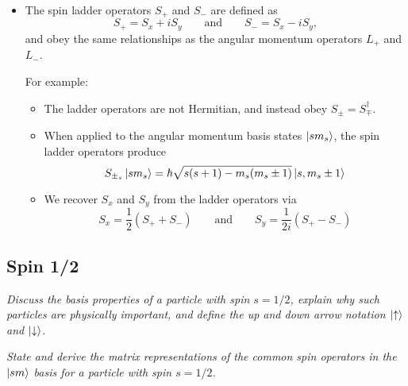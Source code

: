 \documentclass[11pt, a4paper]{article}
\newcommand{\eqtext}[1]{\qquad \text{#1} \qquad}
\newcommand{\Herm}{Hermitian\xspace}
\newcommand{\ua}{\uparrow}  %
\newcommand{\da}{\downarrow}  %
\begin{document}
\begin{itemize}
	\item The spin ladder operators $ S_{+} $ and $ S_{-} $ are defined as
	\begin{equation*}
        S_{+} = S_{x} + iS_{y} \eqtext{and} S_{-} = S_{x} - i S_{y},
    \end{equation*}
    and obey the same relationships as the angular momentum operators $ L_{+} $ and $ L_{-} $.

    For example:
    \begin{itemize}
        \item The ladder operators are not \Herm, and instead obey $ S_{\pm} = S_{\mp}^{\dagger} $. 

        \item When applied to the angular momentum basis states $ \ket{sm_{s}} $, the spin ladder operators produce
        \begin{equation*}
            S_{\pm_{s}} \ket{sm_{s}} = \hbar \sqrt{s(s+1) - m_{s}(m_{s} \pm 1)}\ket{s, m_{s} \pm 1}
        \end{equation*}

        \item We recover $ S_{x} $ and $ S_{y} $ from the ladder operators via
        \begin{equation*}
            S_{x} = \frac{1}{2}(S_{+} + S_{-}) \eqtext{and} S_{y} = \frac{1}{2i}(S_{+} - S_{-}) 
        \end{equation*}
    \end{itemize}
	
\end{itemize}


\subsection{Spin 1/2}
\textit{Discuss the basis properties of a particle with spin $ s = 1/2 $, explain why such particles are physically important, and define the up and down arrow notation $ \ket{\ua} $ and $ \ket{\da} $.}

\vspace{2mm}
\textit{State and derive the matrix representations of the common spin operators in the $ \ket{sm} $ basis for a particle with spin $ s = 1/2 $.}
\end{document}
